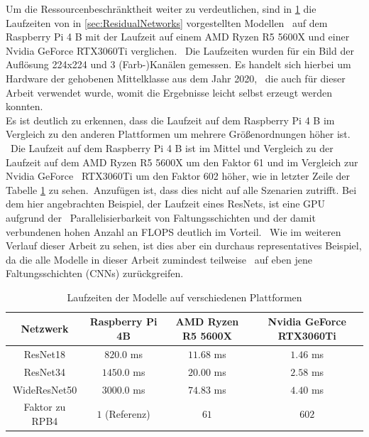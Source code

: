 Um die Ressourcenbeschränktheit weiter zu verdeutlichen, sind in \ref{tab:model-runtimes} die Laufzeiten von in \ref{sec:ResidualNetworks} vorgestellten Modellen \ 
auf dem Raspberry Pi 4 B mit der Laufzeit auf einem AMD Ryzen R5 5600X und einer Nvidia GeForce RTX3060Ti verglichen. \
Die Laufzeiten wurden für ein Bild der Auflösung 224x224 und 3 (Farb-)Kanälen gemessen. Es handelt sich hierbei um Hardware der gehobenen Mittelklasse aus dem Jahr 2020, \
die auch für dieser Arbeit verwendet wurde, womit die Ergebnisse leicht selbst erzeugt werden konnten. \\ 
Es ist deutlich zu erkennen, dass die Laufzeit auf dem Raspberry Pi 4 B im Vergleich zu den anderen Plattformen um mehrere Größenordnungen höher ist. \
Die Laufzeit auf dem Raspberry Pi 4 B ist im Mittel und Vergleich zu der Laufzeit auf dem AMD Ryzen R5 5600X um den Faktor 61 und im Vergleich zur Nvidia GeForce \ 
RTX3060Ti um den Faktor 602 höher, wie in letzter Zeile der Tabelle \ref{tab:model-runtimes} zu sehen.\
Anzufügen ist, dass dies nicht auf alle Szenarien zutrifft. Bei dem hier angebrachten Beispiel, der Laufzeit eines ResNets, ist eine GPU aufgrund der \
Parallelisierbarkeit von Faltungsschichten und der damit verbundenen hohen Anzahl an FLOPS deutlich im Vorteil. \
Wie im weiteren Verlauf dieser Arbeit zu sehen, ist dies aber ein durchaus representatives Beispiel, da die alle Modelle in dieser Arbeit zumindest teilweise \
auf eben jene Faltungsschichten (CNNs) zurückgreifen. \

\begin{table}[h]
  \centering
  \begin{tabular}{|c|c|c|c|}
  \hline
  \textbf{Netzwerk} & \textbf{Raspberry Pi 4B} & \textbf{AMD Ryzen R5 5600X} & \textbf{Nvidia GeForce RTX3060Ti} \\ \hline
  ResNet18         & $\num{820,0}$ \si{\milli\second} & $\num{11,68}$ \si{\milli\second} & $\num{1,46}$ \si{\milli\second} \\ \hline
  ResNet34         & $\num{1450,0}$ \si{\milli\second} & $\num{20,00}$ \si{\milli\second} & $\num{2,58}$ \si{\milli\second} \\ \hline
  WideResNet50     & $\num{3000,0}$ \si{\milli\second} & $\num{74,83}$ \si{\milli\second} & $\num{4,40}$ \si{\milli\second} \\ \hline
  Faktor zu RPB4\tablefootnote{Raspberry Pi 4B}  & $\num{1}$ (Referenz) & $\num{61}$ & $\num{602}$ \\ \hline
  \end{tabular}
  \caption{Laufzeiten der Modelle auf verschiedenen Plattformen}
  \label{tab:model-runtimes}
\end{table}